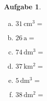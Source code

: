 \documentclass[12pt,fleqn]{article}
\theoremstyle{aufg}
\newtheorem{aufgabe}{Aufgabe}
\theoremstyle{bsp}
\begin{document}
\begin{flushleft}
\begin{aufgabe}
\begin{multicols}{3} 
\begin{enumerate}[a)] 
\item 
$31\,\mathrm{cm^3}=$
\item 
$26\,\mathrm{a}=$
\item 
$74\,\mathrm{dm^3}=$
\item 
$37\,\mathrm{km^2}=$
\item 
$5\,\mathrm{dm^3}=$
\item 
$38\,\mathrm{dm^2}=$
\end{enumerate} 
\end{multicols} 
\end{aufgabe} 
\end{flushleft} 
\end{document}
